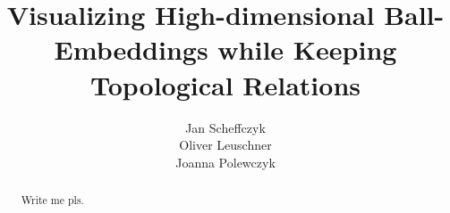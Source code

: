 \documentclass[a4paper, twoside]{report}
\title{Visualizing High-dimensional Ball-Embeddings while Keeping Topological Relations}
\author{Jan Scheffczyk \\ Oliver Leuschner \\ Joanna Polewczyk}
\begin{document}


\begin{abstract}
Write me pls.
\end{abstract}


\tableofcontents
\listoffigures











\end{document}
